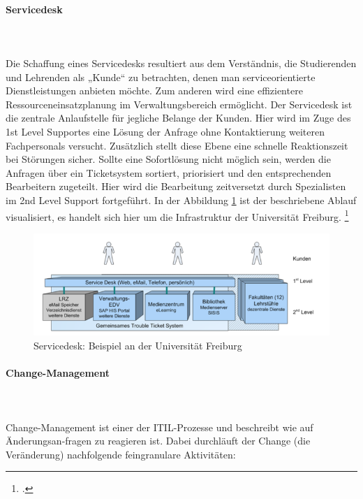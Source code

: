 \paragraph{Servicedesk}\mbox{}\\\\
\label{subsubsection_service_desk}
Die Schaffung eines Servicedesks resultiert aus dem Verständnis, die Studierenden und Lehrenden als 
„Kunde“ zu betrachten, denen man serviceorientierte Dienstleistungen anbieten möchte. Zum anderen 
wird eine effizientere Ressourceneinsatzplanung im Verwaltungsbereich ermöglicht. Der Servicedesk ist 
die zentrale Anlaufstelle für jegliche Belange der Kunden. Hier wird im Zuge des 1st Level Supportes 
eine Lösung der Anfrage ohne Kontaktierung weiteren Fachpersonals versucht. Zusätzlich stellt diese 
Ebene eine schnelle Reaktionszeit bei Störungen sicher. Sollte eine Sofortlösung nicht möglich sein, 
werden die Anfragen über ein Ticketsystem sortiert, priorisiert und den entsprechenden Bearbeitern 
zugeteilt. Hier wird die Bearbeitung zeitversetzt durch Spezialisten im 2nd Level Support fortgeführt. In 
der Abbildung \ref{fig_service_desk} ist der beschriebene Ablauf visualisiert, es handelt sich hier um 
die Infrastruktur der Universität Freiburg. \footcite[Vgl.][5]{klug_2008}

\begin{figure}[h!]
	\centering
	\includegraphics[width=\textwidth]{kapitel/gruppe1_2/bilder/ServiceDesk}
	\caption{Servicedesk: Beispiel an der Universität Freiburg\protect\footnotemark}
	\label{fig_service_desk}
\end{figure}
\newpage

\paragraph{Change-Management}\mbox{}\\\\
Change-Management ist einer der ITIL-Prozesse und beschreibt wie auf Änderungsan-fragen zu reagieren ist. Dabei durchläuft der Change (die Veränderung) nachfolgende feingranulare Aktivitäten:

